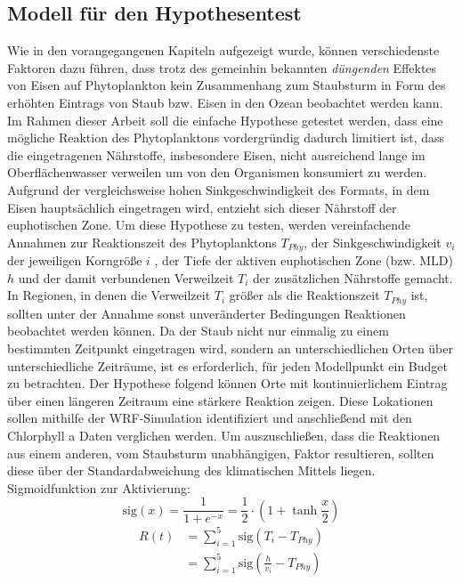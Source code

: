 \documentclass[12pt,a4paper,onecolumn]{scrartcl}
\begin{document}
\subsection{Modell für den Hypothesentest} \label{sec:hypotest}
Wie in den vorangegangenen Kapiteln aufgezeigt wurde, können verschiedenste Faktoren dazu führen, dass trotz des gemeinhin bekannten \textit{düngenden} Effektes von Eisen auf Phytoplankton kein Zusammenhang zum Staubsturm in Form des erhöhten Eintrags von Staub bzw. Eisen in den Ozean beobachtet werden kann. Im Rahmen dieser Arbeit soll die einfache Hypothese getestet werden, dass eine mögliche Reaktion des Phytoplanktons vordergründig dadurch limitiert ist, dass die eingetragenen Nährstoffe, insbesondere Eisen, nicht ausreichend lange im Oberflächenwasser verweilen um von den Organismen konsumiert zu werden. Aufgrund der vergleichsweise hohen Sinkgeschwindigkeit des Formats, in dem Eisen hauptsächlich eingetragen wird, entzieht sich dieser Nährstoff der euphotischen Zone. Um diese Hypothese zu testen, werden vereinfachende Annahmen zur Reaktionszeit des Phytoplanktons $T_{Phy}$, der Sinkgeschwindigkeit $v_i$ der jeweiligen Korngröße $i$ , der Tiefe der aktiven euphotischen Zone (bzw. MLD) $h$ und der damit verbundenen Verweilzeit $T_{i}$ der zusätzlichen Nährstoffe gemacht. In Regionen, in denen die Verweilzeit $T_{i}$ größer als die Reaktionszeit $T_{Phy}$ ist, sollten unter der Annahme sonst unveränderter Bedingungen Reaktionen beobachtet werden können. Da der Staub nicht nur einmalig zu einem bestimmten Zeitpunkt eingetragen wird, sondern an unterschiedlichen Orten über unterschiedliche Zeiträume, ist es erforderlich, für jeden Modellpunkt ein Budget zu betrachten. Der Hypothese folgend können Orte mit kontinuierlichem Eintrag über einen längeren Zeitraum eine stärkere Reaktion zeigen. Diese Lokationen sollen mithilfe der WRF-Simulation identifiziert und anschließend mit den Chlorphyll a Daten verglichen werden. Um auszuschließen, dass die Reaktionen aus einem anderen, vom Staubsturm unabhängigen, Faktor resultieren, sollten diese über der Standardabweichung des klimatischen Mittels liegen.
Sigmoidfunktion zur Aktivierung:
\begin{equation}
\text{sig}(x) = \frac{1}{1+e^{-x}} = \frac{1}{2} \cdot \left(1 + \tanh \frac{x}{2} \right)
\end{equation}
\begin{align}
R(t) &= \sum\limits_{i=1}^5 \text{sig} ( T_{i} - T_{Phy}) \\
&= \sum\limits_{i=1}^5 \text{sig} (\frac{h}{v_i} - T_{Phy})
\end{align}
\end{document}
